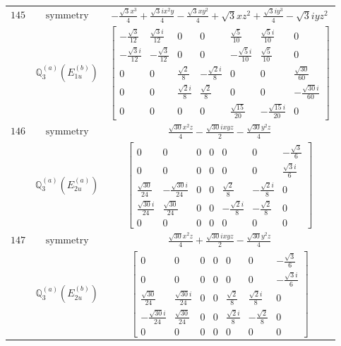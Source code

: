 \documentclass[fleqn,8pt,landscape]{jsarticle}
\begin{document}
\begin{longtable}{ccc}
$ 145 $ & $ \text{symmetry} $ & $ - \frac{\sqrt{3} x^{3}}{4} + \frac{\sqrt{3} i x^{2} y}{4} - \frac{\sqrt{3} x y^{2}}{4} + \sqrt{3} x z^{2} + \frac{\sqrt{3} i y^{3}}{4} - \sqrt{3} i y z^{2} $ \\
$  $ & $ \mathbb{Q}_{3}^{(a)}(E_{1u}^{(b)}) $ & $ \begin{bmatrix} - \frac{\sqrt{3}}{12} & \frac{\sqrt{3} i}{12} & 0 & 0 & \frac{\sqrt{5}}{10} & \frac{\sqrt{5} i}{10} & 0 \\ - \frac{\sqrt{3} i}{12} & - \frac{\sqrt{3}}{12} & 0 & 0 & - \frac{\sqrt{5} i}{10} & \frac{\sqrt{5}}{10} & 0 \\ 0 & 0 & \frac{\sqrt{2}}{8} & - \frac{\sqrt{2} i}{8} & 0 & 0 & \frac{\sqrt{30}}{60} \\ 0 & 0 & \frac{\sqrt{2} i}{8} & \frac{\sqrt{2}}{8} & 0 & 0 & - \frac{\sqrt{30} i}{60} \\ 0 & 0 & 0 & 0 & \frac{\sqrt{15}}{20} & - \frac{\sqrt{15} i}{20} & 0 \end{bmatrix} $ \\ \hline
$ 146 $ & $ \text{symmetry} $ & $ \frac{\sqrt{30} x^{2} z}{4} - \frac{\sqrt{30} i x y z}{2} - \frac{\sqrt{30} y^{2} z}{4} $ \\
$  $ & $ \mathbb{Q}_{3}^{(a)}(E_{2u}^{(a)}) $ & $ \begin{bmatrix} 0 & 0 & 0 & 0 & 0 & 0 & - \frac{\sqrt{3}}{6} \\ 0 & 0 & 0 & 0 & 0 & 0 & \frac{\sqrt{3} i}{6} \\ \frac{\sqrt{30}}{24} & - \frac{\sqrt{30} i}{24} & 0 & 0 & \frac{\sqrt{2}}{8} & - \frac{\sqrt{2} i}{8} & 0 \\ \frac{\sqrt{30} i}{24} & \frac{\sqrt{30}}{24} & 0 & 0 & - \frac{\sqrt{2} i}{8} & - \frac{\sqrt{2}}{8} & 0 \\ 0 & 0 & 0 & 0 & 0 & 0 & 0 \end{bmatrix} $ \\ \hline
$ 147 $ & $ \text{symmetry} $ & $ \frac{\sqrt{30} x^{2} z}{4} + \frac{\sqrt{30} i x y z}{2} - \frac{\sqrt{30} y^{2} z}{4} $ \\
$  $ & $ \mathbb{Q}_{3}^{(a)}(E_{2u}^{(b)}) $ & $ \begin{bmatrix} 0 & 0 & 0 & 0 & 0 & 0 & - \frac{\sqrt{3}}{6} \\ 0 & 0 & 0 & 0 & 0 & 0 & - \frac{\sqrt{3} i}{6} \\ \frac{\sqrt{30}}{24} & \frac{\sqrt{30} i}{24} & 0 & 0 & \frac{\sqrt{2}}{8} & \frac{\sqrt{2} i}{8} & 0 \\ - \frac{\sqrt{30} i}{24} & \frac{\sqrt{30}}{24} & 0 & 0 & \frac{\sqrt{2} i}{8} & - \frac{\sqrt{2}}{8} & 0 \\ 0 & 0 & 0 & 0 & 0 & 0 & 0 \end{bmatrix} $ \\ \hline

\end{longtable}
\end{document}

